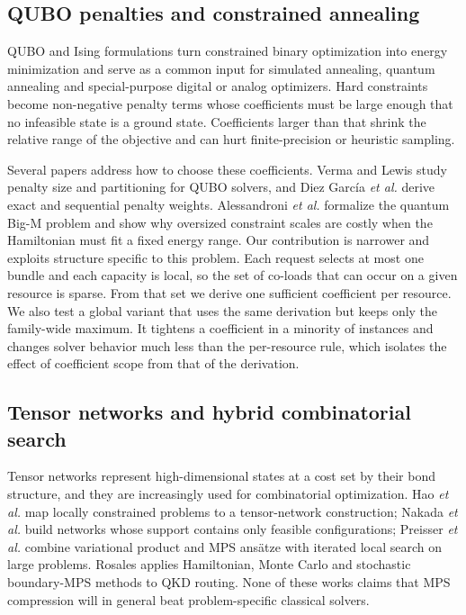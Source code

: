 \documentclass[pdflatex,sn-nature]{sn-jnl}
\theoremstyle{plain}
\theoremstyle{remark}
\begin{document}
\subsection{QUBO penalties and constrained annealing}

QUBO and Ising formulations turn constrained binary optimization into energy minimization and serve as a common input for simulated annealing, quantum annealing and special-purpose digital or analog optimizers\cite{lucas2014,glover2019,kirkpatrick1983,kadowaki1998}. Hard constraints become non-negative penalty terms whose coefficients must be large enough that no infeasible state is a ground state. Coefficients larger than that shrink the relative range of the objective and can hurt finite-precision or heuristic sampling.

Several papers address how to choose these coefficients. Verma and Lewis study penalty size and partitioning for QUBO solvers\cite{verma2022}, and Diez Garc{\'i}a \emph{et al.} derive exact and sequential penalty weights\cite{diez2022}. Alessandroni \emph{et al.} formalize the quantum Big-M problem and show why oversized constraint scales are costly when the Hamiltonian must fit a fixed energy range\cite{alessandroni2025}. Our contribution is narrower and exploits structure specific to this problem. Each request selects at most one bundle and each capacity is local, so the set of co-loads that can occur on a given resource is sparse. From that set we derive one sufficient coefficient per resource. We also test a global variant that uses the same derivation but keeps only the family-wide maximum. It tightens a coefficient in a minority of instances and changes solver behavior much less than the per-resource rule, which isolates the effect of coefficient scope from that of the derivation.

\subsection{Tensor networks and hybrid combinatorial search}

Tensor networks represent high-dimensional states at a cost set by their bond structure\cite{white1992,vidal2003,schollwock2011,orus2014}, and they are increasingly used for combinatorial optimization. Hao \emph{et al.} map locally constrained problems to a tensor-network construction\cite{hao2022}; Nakada \emph{et al.} build networks whose support contains only feasible configurations\cite{nakada2025}; Preisser \emph{et al.} combine variational product and MPS ans\"atze with iterated local search on large problems\cite{preisser2026}. Rosales applies Hamiltonian, Monte Carlo and stochastic boundary-MPS methods to QKD routing\cite{rosales2026}. None of these works claims that MPS compression will in general beat problem-specific classical solvers.
\end{document}
